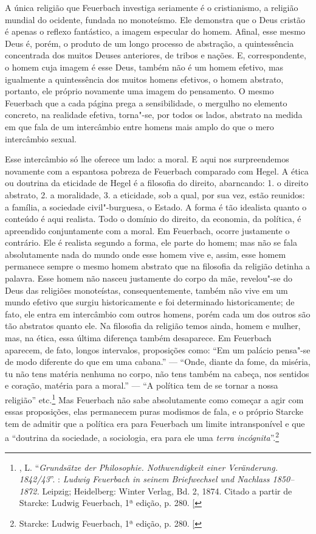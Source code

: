 A única religião
que Feuerbach investiga
seriamente é o cristianismo, a religião mundial do ocidente, fundada no
monoteísmo. Ele demonstra que o Deus cristão é apenas o reflexo
fantástico, a imagem especular do homem. Afinal, esse mesmo Deus é,
porém, o produto de um longo processo de abstração, a quintessência
concentrada dos muitos Deuses anteriores, de tribos e nações. E,
correspondente, o homem cuja imagem é esse Deus, também não é um homem
efetivo, mas igualmente a quintessência dos muitos homens efetivos, o
homem abstrato, portanto, ele próprio novamente uma imagem do
pensamento. O
mesmo Feuerbach que
a cada página prega a sensibilidade, o mergulho no elemento concreto, na
realidade efetiva, torna"-se, por todos os lados, abstrato na medida em
que fala de um intercâmbio entre homens mais amplo do que o mero
intercâmbio sexual.

Esse intercâmbio só lhe oferece um lado: a moral. E aqui nos
surpreendemos novamente com a espantosa pobreza
de Feuerbach comparado
com Hegel.
A ética ou doutrina da eticidade de Hegel é a filosofia do direito,
abarncando: 1. o direito abstrato, 2. a moralidade, 3. a eticidade, sob
a qual, por sua vez, estão reunidos: a família, a sociedade
civil"-burguesa, o Estado. A forma é tão idealista quanto o conteúdo é
aqui realista. Todo o domínio do direito, da economia, da política, é
apreendido conjuntamente com a moral.
Em Feuerbach,
ocorre justamente o contrário. Ele é realista segundo a forma, ele parte
do homem; mas não se fala absolutamente nada do mundo onde esse homem
vive e, assim, esse homem permanece sempre o mesmo homem abstrato que na
filosofia da religião detinha a palavra. Esse homem não nasceu
justamente do corpo da mãe, revelou"-se do Deus das religiões
monoteístas, consequentemente, também não vive em um mundo efetivo que
surgiu historicamente e foi determinado historicamente; de fato, ele
entra em intercâmbio com outros homens, porém cada um dos outros são tão
abstratos quanto ele. Na filosofia da religião temos ainda, homem e
mulher, mas, na ética, essa última diferença também desaparece.
Em Feuerbach
aparecem, de fato, longos intervalos, proposições como: ``Em um palácio
pensa"-se de modo diferente do que em uma cabana.'' --- ``Onde, diante da
fome, da miséria, tu não tens matéria nenhuma no corpo, não tens também
na cabeça, nos sentidos e coração, matéria
para a moral.'' --- ``A política tem de se tornar a nossa
religião'' etc.\footnote{, L. ``\emph{Grundsätze der Philosophie. Nothwendigkeit einer Veränderung. 1842/43}''. : \emph{Ludwig Feuerbach in seinem
  Briefwechsel und Nachlass 1850--1872.} Leipzig; Heidelberg: Winter
  Verlag, Bd. 2, 1874. Citado a partir de Starcke: Ludwig Feuerbach, 1ª
  edição, p. 280. {[}\versal{N.\,T.}{]}}
Mas Feuerbach não
sabe absolutamente como começar a agir com essas proposições, elas
permanecem puras modismos de fala, e o próprio Starcke tem de admitir
que a política era
para Feuerbach um
limite intransponível e que a ``doutrina da sociedade, a sociologia, era
para ele uma \emph{terra
incógnita}''.\footnote{Starcke: Ludwig Feuerbach, 1ª edição, p. 280. {[}\versal{N.\,T.}{]}}

